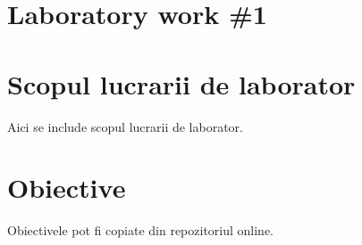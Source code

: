 \section*{Laboratory work \#1}

\section{Scopul lucrarii de laborator}
Aici se include scopul lucrarii de laborator.
\section{Obiective}

Obiectivele pot fi copiate din repozitoriul online.

\clearpage